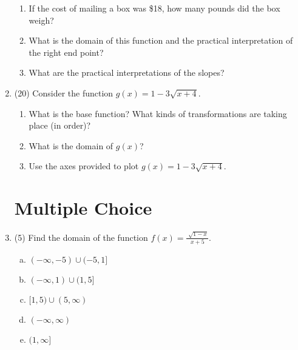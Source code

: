 \documentclass[fleqn]{article}
\renewcommand{\thispagestyle}[1]{}
\begin{document}
\begin{enumerate}
\begin{enumerate}
\item If the cost of mailing a box was \$18, how many pounds did the box weigh?
\vspace{1in}

\item What is the domain of this function and the practical interpretation of the right end point?
\vspace{1in}

\item What are the practical interpretations of the slopes?
\vspace{0.75in}

\end{enumerate}

\item (20) Consider the function $g(x) = 1 - 3 \sqrt{x + 4}$.
\begin{enumerate}
\item What is the base function? What kinds of transformations are taking place (in order)?
\vspace{2in}

\item What is the domain of $g(x)$?

\vspace{1in}

\pagebreak
\thispagestyle{fancy}{
\lhead{}
}

\item Use the axes provided to plot $g(x) = 1 - 3 \sqrt{x + 4}$. 


\end{enumerate}

\section*{Multiple Choice}

\item (5) Find the domain of the function $\displaystyle f(x) = \frac{\sqrt[]{1-x}}{x+5}$.
\begin{multicols}{3}
\begin{enumerate}[(a)\,]
\item $(-\infty,-5) \cup (-5,1]$
\item $(-\infty, 1) \cup (1, 5]$ 
\item $[1,5) \cup (5,\infty)$
\item $(-\infty, \infty)$
\item $(1,\infty]$
\end{enumerate}
\end{multicols}


\end{enumerate}
\end{document}
